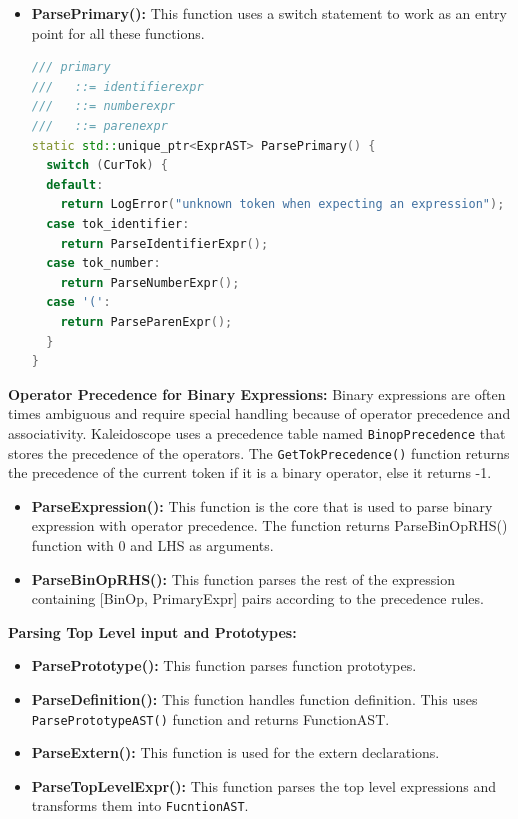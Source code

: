\documentclass[acmlarge, nonacm]{acmart}
\begin{document}
\begin{itemize}
\begin{lstlisting}[language=C++]
  // Eat the ')'.
  getNextToken();

  return std::make_unique<CallExprAST>(IdName, std::move(Args));
}
\end{lstlisting}

\item{\textbf{ParsePrimary():}} This function uses a switch statement to work as an entry point for all these functions.
\begin{lstlisting}[language=C++]
/// primary
///   ::= identifierexpr
///   ::= numberexpr
///   ::= parenexpr
static std::unique_ptr<ExprAST> ParsePrimary() {
  switch (CurTok) {
  default:
    return LogError("unknown token when expecting an expression");
  case tok_identifier:
    return ParseIdentifierExpr();
  case tok_number:
    return ParseNumberExpr();
  case '(':
    return ParseParenExpr();
  }
}
\end{lstlisting}
\end{itemize} 

\textbf{Operator Precedence for Binary Expressions:} Binary expressions are often times ambiguous and require special handling because of operator precedence and associativity. Kaleidoscope uses a precedence table named \verb|BinopPrecedence| that stores the precedence of the operators. The \verb|GetTokPrecedence()| function returns the precedence of the current token if it is a binary operator, else it returns -1.
\begin{itemize}
\item{\textbf{ParseExpression():}} This function is the core that is used to parse binary expression with operator precedence. The function returns ParseBinOpRHS() function with 0 and LHS as arguments.

\item{\textbf{ParseBinOpRHS():}} This function parses the rest of the expression containing [BinOp, PrimaryExpr] pairs according to the precedence rules.
\end{itemize}

\textbf{Parsing Top Level input and Prototypes:}
\begin{itemize}
\item{\textbf{ParsePrototype():}} This function parses function prototypes.
\item{\textbf{ParseDefinition():}} This function handles function definition. This uses \verb|ParsePrototypeAST()| function and returns FunctionAST.
\item{\textbf{ParseExtern():}} This function is used for the extern declarations.
\item{\textbf{ParseTopLevelExpr():}} This function parses the top level expressions and transforms them into \verb|FucntionAST|.
\end{itemize}
\end{document}
